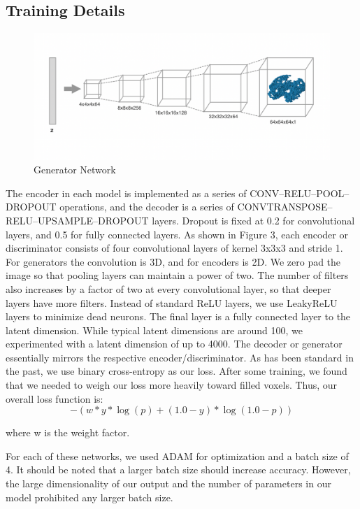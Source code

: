 \documentclass[conference, 10pt]{IEEEtran}
\begin{document}
    
\subsection{Training Details}

\begin{figure}[h]
    \centering
    \includegraphics[scale=0.15]{figure_3.png}
    \caption{Generator Network}
\end{figure}

The encoder in each model is implemented as a series of CONV–RELU–POOL–DROPOUT operations, and the decoder is a series of CONVTRANSPOSE–RELU–UPSAMPLE–DROPOUT layers. Dropout is fixed at 0.2 for convolutional layers, and 0.5 for fully connected layers. As shown in Figure 3, each encoder or discriminator consists of four convolutional layers of kernel 3x3x3 and stride 1. For generators the convolution is 3D, and for encoders is 2D. We zero pad the image so that pooling layers can maintain a power of two. The number of filters also increases by a factor of two at every convolutional layer, so that deeper layers have more filters. Instead of standard ReLU layers, we use LeakyReLU layers to minimize dead neurons. The final layer is a fully connected layer to the latent dimension. While typical latent dimensions are around 100, we experimented with a latent dimension of up to 4000. The decoder or generator essentially mirrors the respective encoder/discriminator. As has been standard in the past, we use binary cross-entropy as our loss. After some training, we found that we needed to weigh our loss more heavily toward filled voxels. Thus, our overall loss function is:
\begin{equation}
-(w * y * \log (p) + (1.0 - y) * \log (1.0 - p))
\end{equation}


where w is the weight factor.

For each of these networks, we used ADAM for optimization and a batch size of 4. It should be noted that a larger batch size should increase accuracy. However, the large dimensionality of our output and the number of parameters in our model prohibited any larger batch size.
\end{document}
